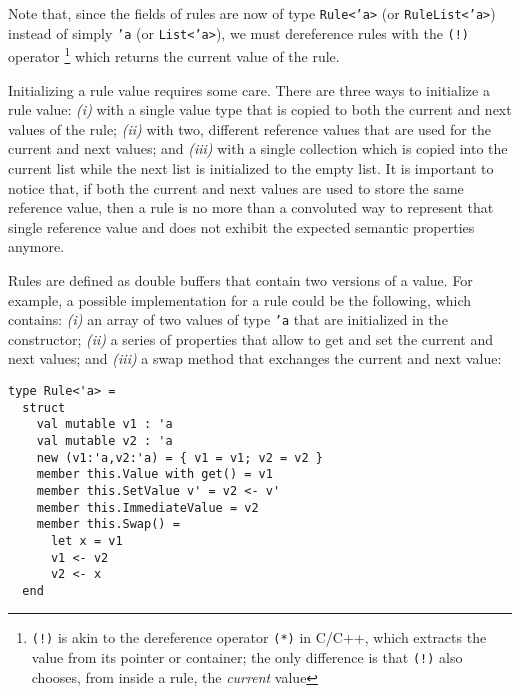 Note that, since the fields of rules are now of type \texttt{Rule<'a>} (or \texttt{RuleList<'a>}) instead of simply \texttt{'a} (or \texttt{List<'a>}), we must dereference rules with the \texttt{(!)} operator \footnote{\texttt{(!)} is akin to the dereference operator \texttt{(*)} in C/C++, which extracts the value from its pointer or container; the only difference is that \texttt{(!)} also chooses, from inside a rule, the \textit{current} value} which returns the current value of the rule.

Initializing a rule value requires some care. There are three ways to initialize a rule value: \textit{(i)} with a single value type that is copied to both the current and next values of the rule; \textit{(ii)} with two, different reference values that are used for the current and next values; and \textit{(iii)} with a single collection which is copied into the current list while the next list is initialized to the empty list. It is important to notice that, if both the current and next values are used to store the same reference value, then a rule is no more than a convoluted way to represent that single reference value and does not exhibit the expected semantic properties anymore.

Rules are defined as double buffers that contain two versions of a value. For example, a possible implementation for a rule could be the following, which contains: \textit{(i)} an array of two values of type \texttt{'a} that are initialized in the constructor; \textit{(ii)} a series of properties that allow to get and set the current and next values; and \textit{(iii)} a swap method that exchanges the current and next value:

\begin{lstlisting}
type Rule<'a> =
  struct
    val mutable v1 : 'a
    val mutable v2 : 'a
    new (v1:'a,v2:'a) = { v1 = v1; v2 = v2 }
    member this.Value with get() = v1
    member this.SetValue v' = v2 <- v'
    member this.ImmediateValue = v2
    member this.Swap() =
      let x = v1
      v1 <- v2
      v2 <- x
  end
\end{lstlisting}


